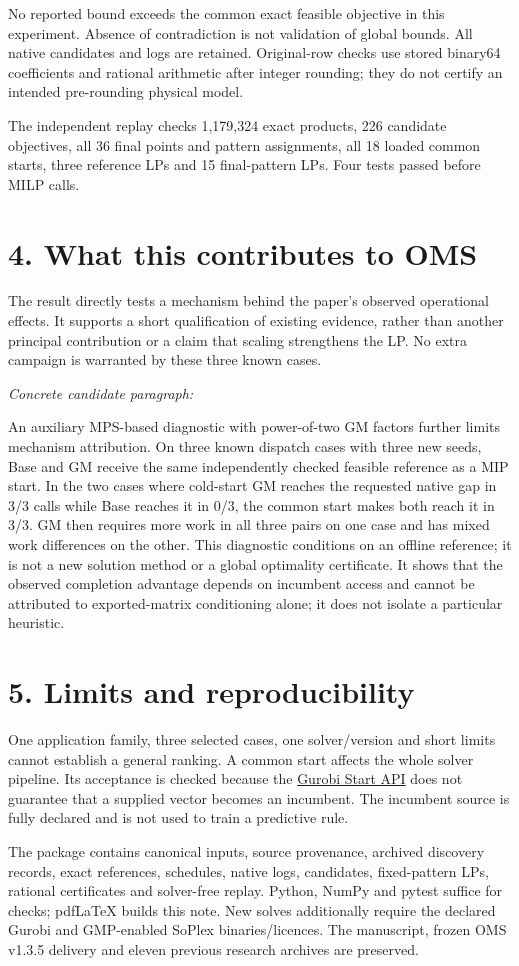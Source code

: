 \documentclass[10pt,a4paper]{article}
\begin{document}
No reported bound exceeds the common exact feasible objective in this
experiment. Absence of contradiction is not validation of global bounds.
All native candidates and logs are retained. Original-row checks use stored
binary64 coefficients and rational arithmetic after integer rounding; they do
not certify an intended pre-rounding physical model.

The independent replay checks 1,179,324 exact products, 226 candidate objectives, all 36 final points and pattern assignments, all 18 loaded common starts, three reference LPs and 15 final-pattern LPs. Four tests passed before MILP calls.

\section*{4. What this contributes to OMS}
The result directly tests a mechanism behind the paper's observed operational
effects. It supports a short qualification of existing evidence, rather than
another principal contribution or a claim that scaling strengthens the LP.
No extra campaign is warranted by these three known cases.

\textit{Concrete candidate paragraph:}

An auxiliary MPS-based diagnostic with power-of-two GM factors further
limits mechanism attribution.
On three known dispatch cases with three new seeds, Base and GM receive the
same independently checked feasible reference as a MIP start. In the two cases
where cold-start GM reaches the requested native gap in 3/3 calls while Base
reaches it in 0/3, the common start makes both reach it in 3/3. GM then requires
more work in all three pairs on one case and has mixed work differences on the
other. This diagnostic conditions on an offline reference; it is not a new
solution method or a global optimality certificate. It shows that the observed
completion advantage depends on incumbent access and cannot be attributed to
exported-matrix conditioning alone; it does not isolate a particular heuristic.


\section*{5. Limits and reproducibility}
One application family, three selected cases, one solver/version and short
limits cannot establish a general ranking. A common start affects the whole
solver pipeline. Its acceptance is checked because the
\href{https://docs.gurobi.com/projects/optimizer/en/current/reference/attributes/variable.html#attr:Start}{Gurobi Start API}
does not guarantee that a supplied vector becomes an incumbent. The incumbent
source is fully declared and is not used to train a predictive rule.

The package contains canonical inputs, source provenance, archived discovery
records, exact references, schedules, native logs, candidates, fixed-pattern
LPs, rational certificates and solver-free replay. Python, NumPy and pytest
suffice for checks; pdfLaTeX builds this note. New solves additionally require
the declared Gurobi and GMP-enabled SoPlex binaries/licences. The manuscript,
frozen OMS v1.3.5 delivery and eleven previous research archives are preserved.
\end{document}
